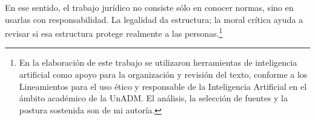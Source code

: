 \documentclass[
	spanish,
	letterpaper, oneside
]{article}
\begin{document}
En ese sentido, el trabajo jurídico no consiste sólo en conocer normas, sino en usarlas con responsabilidad. La legalidad da estructura; la moral crítica ayuda a revisar si esa estructura protege realmente a las personas.\footnote{En la elaboración de este trabajo se utilizaron herramientas de inteligencia artificial como apoyo para la organización y revisión del texto, conforme a los Lineamientos para el uso ético y responsable de la Inteligencia Artificial en el ámbito académico de la UnADM. El análisis, la selección de fuentes y la postura sostenida son de mi autoría.}

% 




\end{document}
